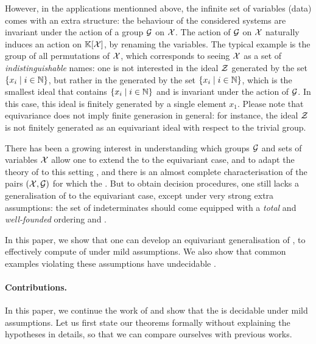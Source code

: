 \AP However, in the applications mentionned above, the infinite set of
variables (data) comes with an extra structure: the behaviour of the considered
systems are invariant under the action of a group $\mathcal{G}$ on $\mathcal{X}$. The action
of $\mathcal{G}$ on $\mathcal{X}$ naturally induces an action on $\mathbb{K}[\mathcal{X}]$, by renaming
the variables. The typical example is the group of all permutations of $\mathcal{X}$,
which corresponds to seeing $\mathcal{X}$ as a set of \emph{indistinguishable} names:
one is not interested in the ideal $\mathcal{Z}$ generated by the set $\{ x_i \mid i
\in \mathbb{N} \}$, but rather in the  generated by the set
$\{ x_i \mid i \in \mathbb{N} \}$, which is the smallest ideal that contains
$\{ x_i \mid i \in \mathbb{N} \}$ and is invariant under the action of $\mathcal{G}$. In this
case, this ideal is finitely generated by a single element $x_1$. Please note
that equivariance does not imply finite generasion in general: for instance,
the ideal $\mathcal{Z}$ is not finitely generated as an equivariant ideal with
respect to the trivial group.

\AP There has been a growing interest in understanding which groups $\mathcal{G}$
and sets of variables $\mathcal{X}$ allow one to extend the 
to the equivariant case, and to adapt the theory of  to
this setting \cite{BRDR11,HISU12,HIKRLE18,GHOLAS24}, and there is an almost
complete characterisation of the pairs $(\mathcal{X},\mathcal{G})$ for which the
 \cite[Theorems 11 and 12]{GHOLAS24}.
But to obtain decision procedures, one still lacks a generalisation of
 to the equivariant case, except under very strong
extra assumptions: the set of indeterminates should come equipped with a
\emph{total} and \emph{well-founded} ordering \cite{HIKRLE18} and \cite[Section
6]{GHOLAS24}.

\AP In this paper, we show that one can develop an equivariant generalisation
of , to effectively compute 
of  under mild assumptions. We also show that common
examples violating these assumptions have undecidable .

\paragraph{Contributions.} \AP In this paper, we continue the work of
\cite{GHOLAS24} and show that the  is
decidable under mild assumptions. Let us first state our theorems 
formally without explaining the hypotheses in details, so that we can 
compare ourselves with previous works.

